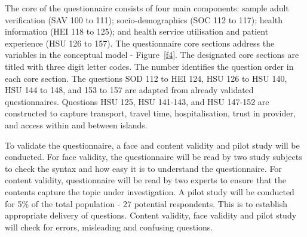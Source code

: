 
The core of the questionnaire consists of four main components: sample adult verification (SAV 100 to 111); socio-demographics (SOC 112 to 117); health information (HEI 118 to 125); and health service utilisation and patient experience (HSU 126 to 157). The questionnaire core sections address the variables in the conceptual model - Figure~\ref{f4}. The designated core sections are titled with three digit letter codes. The number identifies the question order in each core section. The questions SOD 112 to HEI 124, HSU 126 to HSU 140, HSU 144 to 148, and 153 to 157 are adapted from already validated questionnaires. Questions HSU 125, HSU 141-143, and HSU 147-152 are constructed to capture transport, travel time, hospitalisation, trust in provider, and access within and between islands. 

To validate the questionnaire, a face and content validity and pilot study will be conducted. For face validity, the questionnaire will be read by two study subjects to check the syntax and how easy it is to understand the questionnaire. For content validity, questionnaire will be read by two experts to ensure that the contents capture the topic under investigation. A pilot study will be conducted for 5\% of the total population - 27 potential respondents. This is to establish appropriate delivery of questions. Content validity, face validity and pilot study will check for errors, misleading and confusing questions. 


